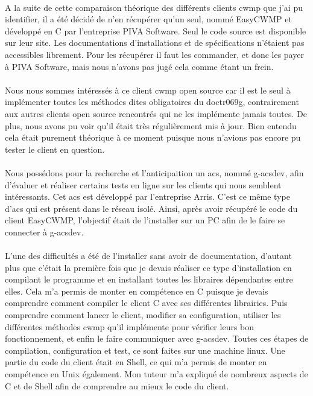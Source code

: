 \documentclass[12pt,a4paper]{report}
\begin{document}
\paragraph*{}A la suite de cette comparaison théorique des différents clients \gls{cwmp} que j’ai pu identifier, il a été décidé de n’en récupérer qu’un seul, nommé EasyCWMP et développé en C par l’entreprise PIVA Software. Seul le code source est disponible sur leur site. Les documentations d’installations et de spécifications n’étaient pas accessibles librement. Pour les récupérer il faut les commander, et donc les payer à PIVA Software, mais nous n'avons pas jugé cela comme étant un frein.
\paragraph*{}Nous nous sommes intéressés à ce client \gls{cwmp} open source car il est le seul à implémenter toutes les méthodes dites obligatoires du \gls{doctr069g}, contrairement aux autres clients open source rencontrés qui ne les implémente jamais toutes. De plus, nous avons pu voir qu’il était très régulièrement mis à jour. Bien entendu cela était purement théorique à ce moment puisque nous n'avions pas encore pu tester le client en question.
\paragraph*{}Nous possédons pour la recherche et l'anticipaition un \gls{acs}, nommé g-acsdev, afin d'évaluer et réaliser certains tests en ligne sur les clients qui nous semblent intéressants. Cet \gls{acs} est développé par l'entreprise Arris. C'est ce même type d'\gls{acs} qui est présent dans le réseau isolé. Ainsi, après avoir récupéré le code du client EasyCWMP, l’objectif était de l’installer sur un PC afin de le faire se connecter à g-acsdev.
\paragraph*{}L’une des difficultés a été de l’installer sans avoir de documentation, d’autant plus que c’était la première fois que je devais réaliser ce type d’installation en compilant le programme et en installant toutes les libraires dépendantes entre elles. Cela m’a permis de monter en compétence en C puisque je devais comprendre comment compiler le client C avec ses différentes librairies. Puis comprendre comment lancer le client, modifier sa configuration, utiliser les différentes méthodes \gls{cwmp} qu’il implémente pour vérifier leurs bon fonctionnement, et enfin le faire communiquer avec g-acsdev. Toutes ces étapes de compilation, configuration et test, ce sont faites sur une machine linux. Une partie du code du client était en Shell, ce qui m’a permis de monter en compétence en Unix également. Mon tuteur m’a expliqué de nombreux aspects de C et de Shell afin de comprendre au mieux le code du client.
\end{document}
